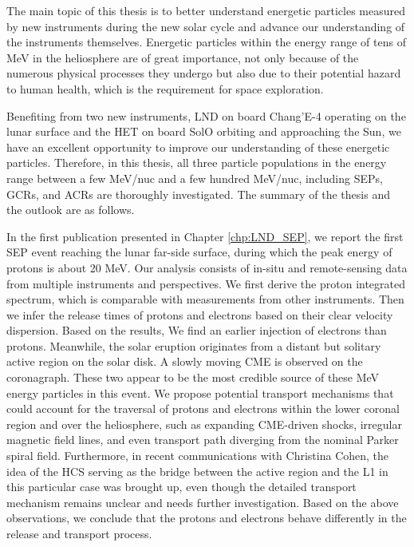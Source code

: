 

The main topic of this thesis is to better understand energetic particles measured by new instruments during the new solar cycle and advance our understanding of the instruments themselves. Energetic particles within the energy range of tens of MeV in the heliosphere are of great importance, not only because of the numerous physical processes they undergo but also due to their potential hazard to human health, which is the requirement for space exploration.

Benefiting from two new instruments, \ac{LND} on board Chang'E-4 operating on the lunar surface and the \ac{HET} on board \ac{SolO} orbiting and approaching the Sun, we have an excellent opportunity to improve our understanding of these energetic particles.
Therefore, in this thesis, all three particle populations in the energy range between a few MeV/nuc and a few hundred MeV/nuc, including \acp{SEP}, \acp{GCR}, and \acp{ACR} are thoroughly investigated. The summary of the thesis and the outlook are as follows.


In the first publication presented in Chapter \ref{chp:LND_SEP}, we report the first \ac{SEP} event reaching the lunar far-side surface, during which the peak energy of protons is about 20 MeV.
Our analysis consists of in-situ and remote-sensing data from multiple instruments and perspectives. We first derive the proton integrated spectrum, which is comparable with measurements from other instruments. Then we infer the release times of protons and electrons based on their clear velocity dispersion. Based on the results, We find an earlier injection of electrons than protons. 
Meanwhile, the solar eruption originates from a distant but solitary active region on the solar disk. A slowly moving \ac{CME} is observed on the coronagraph. These two appear to be the most credible source of these MeV energy particles in this event. We propose potential transport mechanisms that could account for the traversal of protons and electrons within the lower coronal region and over the heliosphere, such as expanding \ac{CME}-driven shocks, irregular magnetic field lines, and even transport path diverging from the nominal Parker spiral field. Furthermore, in recent communications with Christina Cohen, the idea of the \ac{HCS} serving as the bridge between the active region and the \ac{L1} in this particular case was brought up, even though the detailed transport mechanism remains unclear and needs further investigation. Based on the above observations, we conclude that the protons and electrons behave differently in the release and transport process. 

